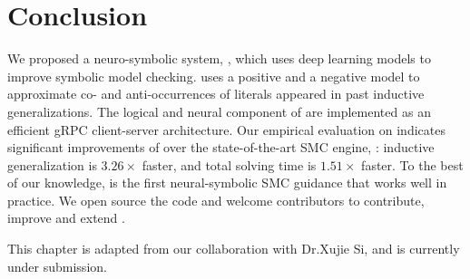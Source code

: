 \section{Conclusion}
\label{sec:2-conclusion}
 We proposed a neuro-symbolic system, \dpy, which uses deep learning models to improve symbolic model checking.
 \dpy uses a positive and a negative model to approximate co- and anti-occurrences of literals appeared in past inductive generalizations.
 The logical and neural component of \dpy are implemented as an efficient gRPC client-server architecture.
 Our empirical evaluation on \chccomp indicates significant improvements of \dpy over the state-of-the-art SMC engine, \spc: inductive generalization is $3.26\times$ faster, and total solving time is $1.51\times$ faster. To the best of our knowledge, \dpy is the first neural-symbolic SMC guidance that works well in practice. We open source the code and welcome contributors to contribute, improve and extend \dpy.

This chapter is adapted from our collaboration with Dr.Xujie Si, and is currently under submission.